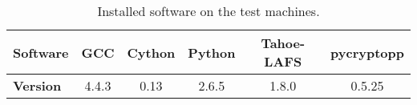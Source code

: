 \begin{table}[h]
  \centering
  \begin{tabular}{ | l | c | c | c | c | c | }
    \hline
    \textbf{Software} & \ac{GCC} & Cython & Python & Tahoe-\ac{LAFS} & pycryptopp \\ \hline
    \textbf{Version} & 4.4.3 & 0.13 & 2.6.5 & 1.8.0 & 0.5.25 \\ \hline
  \end{tabular}
  \caption{Installed software on the test machines.}
  \label{tbl:installedsw}
\end{table}
